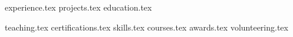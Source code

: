 \documentclass[letterpaper,11pt]{article}
\begin{document}


{experience.tex}
{projects.tex}
{education.tex}

\pagebreak

{teaching.tex}
\sidebyside
    {{certifications.tex}}
    {{skills.tex}
    {courses.tex}}
{awards.tex}
{volunteering.tex}
\end{document}
